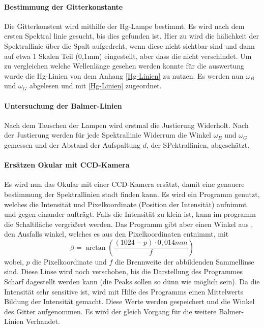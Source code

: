 \paragraph{Bestimmung der Gitterkonstante}

Die Gitterkonstent wird mithilfe der Hg-Lampe bestimmt.
Es wird nach dem ersten Spektral linie gesucht, bis dies gefunden ist. 
Hier zu wird die hälichkeit der Spektrallinie über die Spalt aufgedreht, wenn diese nicht sichtbar sind und dann auf etwa 1 Skalen Teil (0,1mm) eingestellt, aber dass die nicht verschindet.
Um zu vergleichen welche Wellenlänge gesehen werden konnte für die auswertung wurde die Hg-Linien von dem Anhang \cref{Hg-Linien} zu nutzen.
Es werden nun $\omega_B$ und $\omega_G$ abgelesen und mit \cref{Hg-Linien} zugeordnet.

\paragraph{Untersuchung der Balmer-Linien}
Nach dem Tauschen der Lampen wird erstmal die Justierung Widerholt. 
Nach der Justierung werden für jede Spektrallinie Widerrum die Winkel $\omega_B$ und $\omega_G$ gemessen und der Abstand der Aufspaltung $d$, der SPektrallinien, abgeschätzt.

\paragraph{Ersätzen Okular mit CCD-Kamera}
Es wird nun das Okular mit einer CCD-Kamera ersätzt, damit eine genauere bestimmung der Spektrallinien stadt finden kann. 
Es wird ein Programm genutzt, welches die Intensität und Pixelkoordinate (Position der Intensität) aufnimmt und gegen einander aufträgt. 
Falls die Intensität zu klein ist, kann im programm die Schaltfläche vergrößert werden.
Das Programm gibt aber einen Winkel aus , den Ausfalls winkel, welches es aus den Pixelkoordinaten entnimmt, mit 
\begin{equation}
    \beta = \arctan(\frac{(1024-p)\cdot0,014mm}{f})
\end{equation}
wobei, $p$ die Pixelkoordinate und $f$ die Brennweite der abbildenden Sammellinse sind.
Diese Linse wird noch verschoben, bis die Darstellung des Programmes Scharf dagestellt werden kann (die Peaks sollen so dünn wie möglich sein).
Da die Intensität sehr sensitive ist, wird mit Hilfe des Programms einen Mittelwerts Bildung der Intensität gemacht. 
Diese Werte werden gespeichert und die Winkel des Gitter aufgenommen. 
Es wird der gleich Vorgang für die weitere Balmer-Linien Verhandet.


